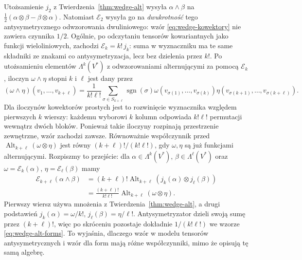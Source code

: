 \begin{uwaga}
Utożsamienie $j_2$ z Twierdzenia~\ref{thm:wedge-alt} wysyła
$\alpha\wedge\beta$ na
$\tfrac12(\alpha\otimes\beta-\beta\otimes\alpha)$.
Natomiast $\mathcal E_2$ wysyła go na \emph{dwukrotność}
tego antysymetrycznego odwzorowania dwuliniowego: wzór
\eqref{eq:wedge-kowektory} nie zawiera czynnika $1/2$.
Ogólnie, po odczytaniu tensorów kowariantnych jako funkcji wieloliniowych,
zachodzi $\mathcal E_k=k!\,j_k$: suma w wyznaczniku ma te same
składniki ze znakami co antysymetryzacja, lecz bez dzielenia przez $k!$.
Po utożsamieniu elementów $\Lambda^k(V^*)$ z
odwzorowaniami alternującymi za pomocą $\mathcal E_k$, iloczyn
$\omega\wedge\eta$ stopni $k$ i $\ell$ jest dany przez
\begin{equation}\label{eq:wedge-alt-forms}
 (\omega\wedge\eta)(v_1,\ldots,v_{k+\ell})
 =\frac1{k!\ell!}\sum_{\sigma\in S_{k+\ell}}
 \operatorname{sgn}(\sigma)
 \omega(v_{\sigma(1)},\ldots,v_{\sigma(k)})
 \eta(v_{\sigma(k+1)},\ldots,v_{\sigma(k+\ell)}).
\end{equation}
Dla iloczynów kowektorów prostych jest to rozwinięcie
wyznacznika względem pierwszych $k$ wierszy: każdemu
wyborowi $k$ kolumn odpowiada $k!\ell!$ permutacji
wewnątrz dwóch bloków. Ponieważ takie iloczyny rozpinają
przestrzenie zewnętrzne, wzór zachodzi zawsze.
Równoważnie współczynnik przed
$\operatorname{Alt}_{k+\ell}(\omega\otimes\eta)$ jest równy
$(k+\ell)!/(k!\ell!)$, gdy $\omega,\eta$ są już funkcjami
alternującymi. Rozpiszmy to przejście: dla
$\alpha\in\Lambda^k(V^*)$, $\beta\in\Lambda^\ell(V^*)$
oraz $\omega=\mathcal E_k(\alpha)$, $\eta=\mathcal E_\ell(\beta)$ mamy
\[
 \begin{aligned}
 \mathcal E_{k+\ell}(\alpha\wedge\beta)
 &=(k+\ell)!\operatorname{Alt}_{k+\ell}
                  (j_k(\alpha)\otimes j_\ell(\beta))\\
 &=\frac{(k+\ell)!}{k!\ell!}
       \operatorname{Alt}_{k+\ell}(\omega\otimes\eta).
 \end{aligned}
\]
Pierwszy wiersz używa mnożenia z
Twierdzenia~\ref{thm:wedge-alt}, a drugi podstawień
$j_k(\alpha)=\omega/k!$, $j_\ell(\beta)=\eta/\ell!$.
Antysymetryzator dzieli swoją sumę przez $(k+\ell)!$,
więc po skróceniu pozostaje dokładnie $1/(k!\ell!)$
we wzorze \eqref{eq:wedge-alt-forms}.
To wyjaśnia, dlaczego wzór w modelu tensorów antysymetrycznych
i wzór dla form mają różne współczynniki, mimo że opisują tę samą algebrę.
\end{uwaga}

